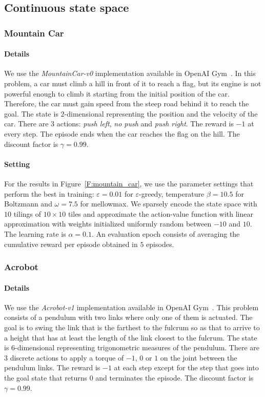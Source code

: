 \subsection{Continuous state space}
\subsubsection{Mountain Car}
\paragraph{Details} We use the \textit{MountainCar-v0} implementation available in OpenAI Gym~\cite{gym}. In this problem, a car must climb a hill in front of it to reach a flag, but its engine is not powerful enough to climb it starting from the initial position of the car. Therefore, the car must gain speed from the steep road behind it to reach the goal. The state is $2$-dimensional representing the position and the velocity of the car. There are $3$ actions: \textit{push left}, \textit{no push} and \textit{push right}. The reward is $-1$ at every step. The episode ends when the car reaches the flag on the hill. The discount factor is $\gamma = 0.99$.
\paragraph{Setting} For the results in Figure~\ref{F:mountain_car}, we use the parameter settings that perform the best in training: $\varepsilon = 0.01$ for $\varepsilon$-greedy, temperature $\beta = 10.5$ for Boltzmann and $\omega = 7.5$ for mellowmax. We sparsely encode the state space with $10$ tilings of $10 \times 10$ tiles and approximate the action-value function with linear approximation with weights initialized uniformly random between $-10$ and $10$. The learning rate is $\alpha = 0.1$. An evaluation epoch consists of averaging the cumulative reward per episode obtained in $5$ episodes.

\subsubsection{Acrobot}
\paragraph{Details} We use the \textit{Acrobot-v1} implementation available in OpenAI Gym~\cite{gym}. This problem consists of a pendulum with two links where only one of them is actuated. The goal is to swing the link that is the farthest to the fulcrum so as that to arrive to a height that has at least the length of the link closest to the fulcrum. The state is $6$-dimensional representing trigonometric measures of the pendulum. There are $3$ discrete actions to apply a torque of $-1$, $0$ or $1$ on the joint between the pendulum links. The reward is $-1$ at each step except for the step that goes into the goal state that returns $0$ and terminates the episode. The discount factor is $\gamma = 0.99$. 
